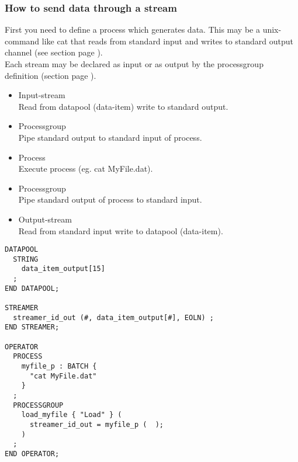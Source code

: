 \subsubsection{How to send data through a stream}
\label{sec:sthowto}
First you need to define a process which generates data. This may be a unix-command like cat that
reads from standard input and writes to standard output channel
(see section  page \pageref{sec:opprocess}). \\
Each stream may be declared as input or as output by the processgroup definition
(section  page \pageref{sec:opprocessgroup}).
\begin{itemize}
\item Input-stream \\
Read from datapool (data-item) write to standard output. \\
\item Processgroup \\
Pipe standard output to standard input of process. \\
\item Process \\
Execute process (eg. cat MyFile.dat). \\
\item Processgroup \\
Pipe standard output of process to standard input. \\
\item Output-stream \\
Read from standard input write to datapool (data-item). \\
\end{itemize}



\begin{boxedminipage}[t]{\linewidth}
\begin{verbatim}
DATAPOOL
  STRING
    data_item_output[15]
  ;
END DATAPOOL;

STREAMER
  streamer_id_out (#, data_item_output[#], EOLN) ;
END STREAMER;

OPERATOR
  PROCESS
    myfile_p : BATCH {
      "cat MyFile.dat"
    }
  ;
  PROCESSGROUP
    load_myfile { "Load" } (
      streamer_id_out = myfile_p (  );
    )
  ;
END OPERATOR;
\end{verbatim}
\end{boxedminipage}

